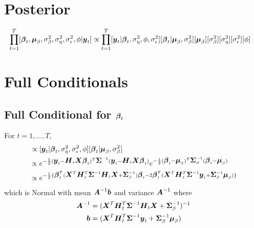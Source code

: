 \documentclass[fleqn]{article}
\def\bm#1{\mbox{\boldmath $#1$}}
\begin{document}
\section{Posterior}
%
\begin{align*}
\prod_{t = 1}^T [\bm{\beta}_t, \bm{\mu}_\beta, \sigma^2_\beta, \sigma^2_\eta, \sigma^2_\epsilon, \phi | \bm{y}_t] & \propto \prod_{t = 1}^T [\bm{y}_t | \bm{\beta}_t, \sigma^2_\eta, \phi, \sigma^2_\epsilon] [\bm{\beta}_t | \bm{\mu}_\beta, \sigma^2_\beta] [\bm{\mu}_\beta] [\sigma^2_\beta] [\sigma^2_\eta] [\sigma^2_\epsilon] [\phi]
\end{align*}
%
\section{Full Conditionals}
%
\subsection{Full Conditional for $\bm{\beta}_t$}
%
For $t = 1, \ldots, T$,
\begin{align*}
[\bm{\beta}_t | \cdot] & \propto [\bm{y}_t | \bm{\beta}_t, \sigma^2_\eta, \sigma^2_\epsilon, \phi] [\bm{\beta}_t | \bm{\mu}_\beta, \sigma^2_\beta]\\
%
& \propto e^{ - \frac{1} {2} (\bm{y}_t - \bm{H}_t \bm{X} \bm{\beta}_t)^T \bm{\Sigma}^{ - 1} (\bm{y}_t - \bm{H}_t \bm{X} \bm{\beta}_t)} e^{ - \frac{1} {2} (\bm{\beta}_t - \bm{\mu}_\beta)^T \bm{\Sigma}_\beta^{ - 1} (\bm{\beta}_t - \bm{\mu}_\beta)}\\
%
& \propto e^{ - \frac{1} {2} \{\bm{\beta}_t^T (\bm{X}^T \bm{H}_t^T \bm{\Sigma}^{ - 1} \bm{H}_t \bm{X} + \bm{\Sigma}_\beta^{ - 1}) \bm{\beta}_t - 2 \bm{\beta}_t^T (\bm{X}^T \bm{H}_t^T \bm{\Sigma}^{ - 1} \bm{y}_t + \bm{\Sigma}_\beta^{ - 1} \bm{\mu}_\beta) \} }
\end{align*}
%
which is Normal with mean $ \bm{A}^{ - 1} \bm{b}$ and variance $\bm{A}^{ - 1}$ where
\begin{align*}
  \bm{A}^{ - 1} & = (\bm{X}^T \bm{H}_t^T \bm{\Sigma}^{ - 1} \bm{H}_t \bm{X} + \bm{\Sigma}_\beta^{ - 1})^{ - 1}\\
  \bm{b} & = (\bm{X}^T \bm{H}_t^T \bm{\Sigma}^{ - 1} \bm{y}_t + \bm{\Sigma}_\beta^{ - 1} \bm{\mu}_\beta)\\
\end{align*}
%
\end{document}
